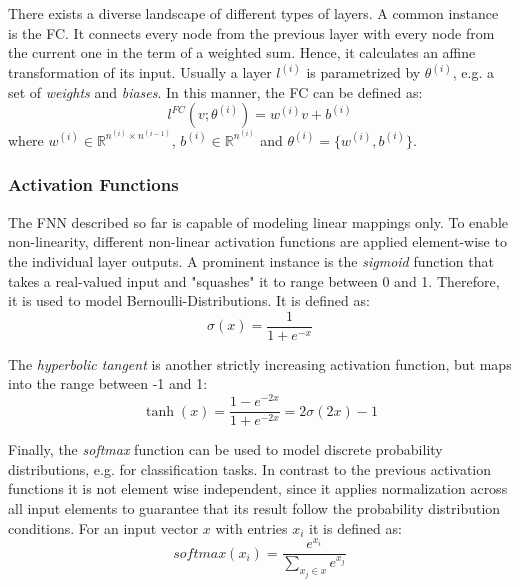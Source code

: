There exists a diverse landscape of different types of layers. A common instance is the \ac{FC}. It connects every node from the previous layer with every node from the current one in the term of a weighted sum. Hence, it calculates an affine transformation of its input. Usually a layer $l^{(i)}$ is parametrized by $\theta^{(i)}$, e.g. a set of \textit{weights} and \textit{biases}. In this manner, the \ac{FC} can be defined as:
\begin{equation}
l^{FC}(v;\theta^{(i)}) = w^{(i)}v+b^{(i)} 
\end{equation}
where $w^{(i)} \in \mathbb{R}^{n^{(i)} \times n^{(i-1)}}$, $b^{(i)} \in \mathbb{R}^{n^{(i)}}$ and $\theta^{(i)}=\{w^{(i)}, b^{(i)}\}$. 

\subsubsection{Activation Functions}
The \ac{FNN} described so far is capable of modeling linear mappings only. To enable non-linearity, different non-linear activation functions are applied element-wise to the individual layer outputs. A prominent instance is the \textit{sigmoid} function that takes a real-valued input and "squashes" it to range between 0 and 1. Therefore, it is used to model Bernoulli-Distributions. It is defined as:
\begin{equation}
\sigma(x)=\frac{1}{1+e^{-x}}
\end{equation}

The \textit{hyperbolic tangent} is another strictly increasing activation function, but maps into the range between -1 and 1:
\begin{equation}
\tanh(x)=\frac{1-e^{-2x}}{1+e^{-2x}}=2\sigma(2x)-1
\end{equation}

Finally, the \textit{softmax} function can be used to model discrete probability distributions, e.g. for classification tasks. In contrast to the previous activation functions it is not element wise independent, since it applies normalization across all input elements to guarantee that its result follow the probability distribution conditions. For an input vector $x$ with entries $x_i$ it is defined as:
\begin{equation}
softmax(x_i) = \frac{e^{x_i}}{\sum\limits_{x_j \in x}e^{x_j}} 
\end{equation}

